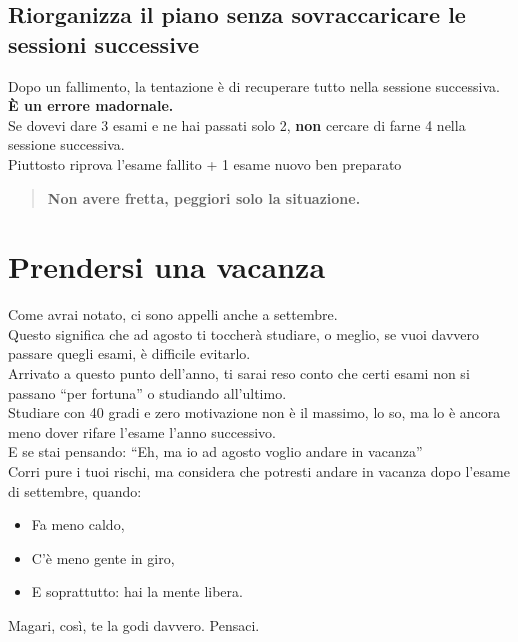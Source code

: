 \documentclass[18pt]{extarticle}
\begin{document}
\subsection{Riorganizza il piano senza sovraccaricare le sessioni successive}
Dopo un fallimento, la tentazione è di recuperare tutto nella sessione successiva.\\
\textbf{È un errore madornale.}\\
Se dovevi dare 3 esami e ne hai passati solo 2, \textbf{non} cercare di farne 4 nella sessione successiva.\\
Piuttosto riprova l'esame fallito + 1 esame nuovo ben preparato
\begin{quote}
\textbf{Non avere fretta, peggiori solo la situazione.}
\end{quote}


\section{Prendersi una vacanza}
Come avrai notato, ci sono appelli anche a settembre.\\
Questo significa che ad agosto ti toccherà studiare, o meglio, se vuoi davvero passare quegli esami, è difficile evitarlo.\\
Arrivato a questo punto dell'anno, ti sarai reso conto che certi esami non si passano ``per fortuna'' o studiando all'ultimo.\\
Studiare con 40 gradi e zero motivazione non è il massimo, lo so, ma lo è ancora meno dover rifare l'esame l'anno successivo.\\
E se stai pensando: ``Eh, ma io ad agosto voglio andare in vacanza''\\
Corri pure i tuoi rischi, ma considera che potresti andare in vacanza dopo l'esame di settembre, quando:
\begin{itemize}
\item Fa meno caldo,
\item C'è meno gente in giro,
\item E soprattutto: hai la mente libera.
\end{itemize}
Magari, così, te la godi davvero. Pensaci.

\clearpage
\end{document}
